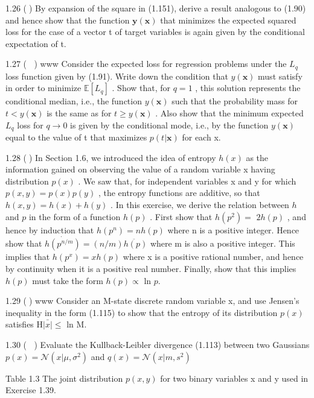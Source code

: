 \documentclass[
  10
]{article}
\begin{document}
1.26 () By expansion of the square in (1.151), derive a result analogous
to (1.90) and hence show that the function
\(\mathbf { y } ( \mathbf { x } )\) that minimizes the expected squared
loss for the case of a vector t of target variables is again given by
the conditional expectation of t.

1.27 ( ) www Consider the expected loss for regression problems under
the \(L _ { q }\) loss function given by (1.91). Write down the
condition that \(y ( \mathbf x )\) must satisfy in order to minimize
\(\mathbb { E } [ L _ { q } ]\) . Show that, for \(q = 1\) , this
solution represents the conditional median, i.e., the function
\(y ( \mathbf x )\) such that the probability mass for
\(t < y ( \mathbf { x } )\) is the same as for
\(t \geqslant y ( \mathbf { x } )\) . Also show that the minimum
expected \(L _ { q }\) loss for \(q \to 0\) is given by the conditional
mode, i.e., by the function \(y ( \mathbf x )\) equal to the value of t
that maximizes \(p ( t | \mathbf { x } )\) for each x.

1.28 () In Section 1.6, we introduced the idea of entropy \(h ( x )\) as
the information gained on observing the value of a random variable x
having distribution \(p ( x )\) . We saw that, for independent variables
x and y for which \(p ( x , y ) = p ( x ) p ( y )\) , the entropy
functions are additive, so that \(h ( x , y ) = h ( x ) + h ( y )\) . In
this exercise, we derive the relation between \(h\) and \(p\) in the
form of a function \(h ( p )\) . First show that \(h ( p ^ { 2 } ) =\)
\(2 h ( p )\) , and hence by induction that
\(h ( p ^ { n } ) = n h ( p )\) where n is a positive integer. Hence
show that
\({ \dot { h ( p ^ { n / m } ) } } = ( n / m ) { \ddot { h ( p ) } }\)
where m is also a positive integer. This implies that
\(h ( p ^ { x } ) = x h ( p )\) where x is a positive rational number,
and hence by continuity when it is a positive real number. Finally, show
that this implies \(h ( p )\) must take the form \(h ( p ) \propto\) ln
\(p .\)

1.29 () www Consider an M-state discrete random variable x, and use
Jensen's inequality in the form (1.115) to show that the entropy of its
distribution \(p ( x )\) satisfies
\(\mathrm { H } \bar { \vert x \vert } \leqslant\) ln M.

1.30 ( ) Evaluate the Kullback-Leibler divergence (1.113) between two
Gaussians \(p ( x ) = \mathcal { N } ( x | \mu , \sigma ^ { 2 } )\) and
\(q ( x ) = \mathcal { N } ( x | m , s ^ { 2 } )\)

Table 1.3 The joint distribution \(p ( x , y )\) for two binary
variables x and y used in Exercise 1.39.
\end{document}
